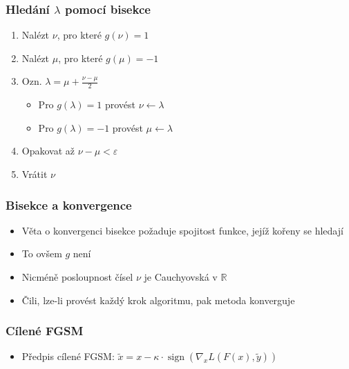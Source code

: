 \documentclass[czech]{beamer}
\begin{document}
\begin{frame}
    \frametitle{Hledání $\lambda$ pomocí bisekce}
    \begin{enumerate}
        \item Nalézt $\nu$, pro které $g(\nu) = 1$
        \item Nalézt $\mu$, pro které $g(\mu) = -1$
        \item Ozn. $\lambda = \mu + \frac{\nu - \mu}{2}$
        \begin{itemize}
            \item Pro $g(\lambda) = 1$ provést $\nu \leftarrow \lambda$
            \item Pro $g(\lambda) = -1$ provést $\mu \leftarrow \lambda$
        \end{itemize}
        \item Opakovat až $\nu - \mu < \varepsilon$
        \item Vrátit $\nu$
    \end{enumerate}
\end{frame}

\begin{frame}
    \frametitle{Bisekce a konvergence}
    \begin{itemize}
        \item Věta o konvergenci bisekce požaduje spojitost funkce, jejíž kořeny se hledají
        \item To ovšem $g$ není
        \item Nicméně posloupnost čísel $\nu$ je Cauchyovská v $\mathbb{R}$
        \item Čili, lze-li provést každý krok algoritmu, pak metoda konverguje
    \end{itemize}
\end{frame}

\begin{frame}
    \frametitle{Cílené FGSM}
    \begin{itemize}
        \item Předpis cílené FGSM: $\tilde{x} = x - \kappa \cdot \operatorname{sign} \left( \nabla_x L(F(x), \tilde{y}) \right)$
    \end{itemize}
\end{frame}
\end{document}

